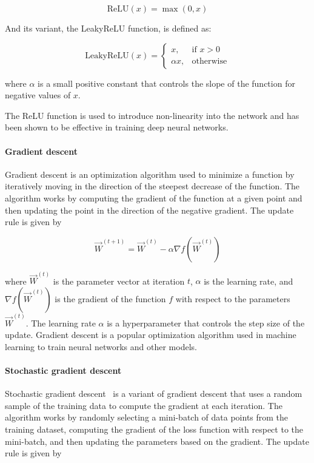 \begin{equation*}
    \textrm{ReLU}(x)=\max(0,x)
\end{equation*}

And its variant, the LeakyReLU function, is defined as:

\begin{equation*}
    \mathrm{LeakyReLU}(x) = 
    \begin{cases} 
        x, & \text{if } x > 0 \\
        \alpha x, & \text{otherwise}
    \end{cases}
\end{equation*}

where $\alpha$ is a small positive constant that controls the slope of the function for negative values of $x$.

The ReLU function is used to introduce non-linearity into the network and has been shown to be effective in training deep neural networks.


\paragraph{Gradient descent}
Gradient descent is an optimization algorithm used to minimize a function by iteratively moving in the direction of the steepest decrease of the function. The algorithm works by computing the gradient of the function at a given point and then updating the point in the direction of the negative gradient. The update rule is given by

\begin{equation} \label{eq:gradient_descent}
    \vec{W}^{(t+1)} = \vec{W}^{(t)} - \alpha \nabla f(\vec{W}^{(t)})
\end{equation}

where $\vec{W}^{(t)}$ is the parameter vector at iteration $t$, $\alpha$ is the learning rate, and $\nabla f(\vec{W}^{(t)})$ is the gradient of the function $f$ with respect to the parameters $\vec{W}^{(t)}$. The learning rate $\alpha$ is a hyperparameter that controls the step size of the update. Gradient descent is a popular optimization algorithm used in machine learning to train neural networks and other models.

\paragraph{Stochastic gradient descent}
Stochastic gradient descent~\cite{robbins1951stochastic} is a variant of gradient descent that uses a random sample of the training data to compute the gradient at each iteration. The algorithm works by randomly selecting a mini-batch of data points from the training dataset, computing the gradient of the loss function with respect to the mini-batch, and then updating the parameters based on the gradient. The update rule is given by

